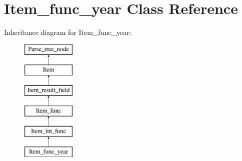 \hypertarget{classItem__func__year}{}\section{Item\+\_\+func\+\_\+year Class Reference}
\label{classItem__func__year}
Inheritance diagram for Item\+\_\+func\+\_\+year\+:\begin{figure}[H]
\begin{center}
\leavevmode
\includegraphics[height=6.000000cm]{classItem__func__year}
\end{center}
\end{figure}
